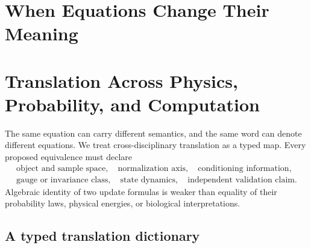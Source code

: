 \documentclass[10pt]{article}
\theoremstyle{definition}
\theoremstyle{remark}
\newcommand{\BookChapter}[1]{\section{#1}}
\newcommand{\BookInsert}[1]{}
\newcommand{\BookChapterLabel}[1]{}
\newcommand{\BookSection}[1]{\subsection{#1}}
\begin{document}
\fi
\ifdefined\BOOKMODE
\BookChapter{When Equations Change Their Meaning}
\BookChapterLabel{chap:book-translation}
\BookInsert{chapters/02_when_equations_change_meaning}
\BookInsert{chapters/02_sequence_msa_primer}
\BookInsert{chapters/02_four_statistical_mechanics_lenses}
\BookInsert{chapters/02_protein_scales_and_claims}
\else
\BookChapter{Translation Across Physics, Probability, and Computation}

The same equation can carry different semantics, and the same word can denote different
equations.  We treat cross-disciplinary translation as a typed map.  Every proposed equivalence
must declare
\begin{equation}
\boxed{
\begin{gathered}
\text{object and sample space},\quad
\text{normalization axis},\quad
\text{conditioning information},\\
\text{gauge or invariance class},\quad
\text{state dynamics},\quad
\text{independent validation claim}.
\end{gathered}}
\label{eq:translation-protocol}
\end{equation}
Algebraic identity of two update formulas is weaker than equality of their probability laws,
physical energies, or biological interpretations.

\BookSection{A typed translation dictionary}
\end{document}
